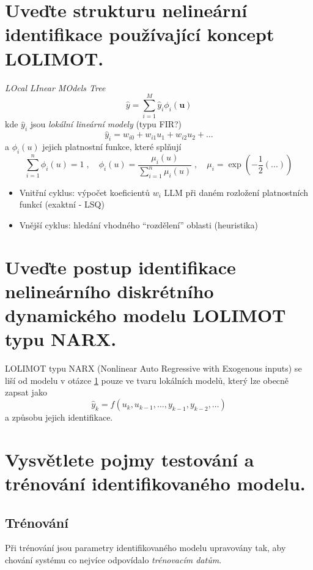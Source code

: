 \documentclass{article}
\begin{document}
	\section{Uveďte strukturu nelineární identifikace používající koncept LOLIMOT. } \label{lolimot}
	\emph{LOcal LInear MOdels Tree}
	\begin{equation}
		\hat{y} = \sum_{i=1}^M \hat{y}_i \phi_i(\bm{u})
	\end{equation}
	kde $\hat{y}_i$ jsou \emph{lokální lineární modely} (typu FIR?)
	\begin{equation}
		\hat{y}_i = w_{i0} + w_{i1} u_1 + w_{i2} u_2 + \dots
	\end{equation}
	a $\phi_i(u)$ jejich platnostní funkce, které splňují
	\begin{equation}
		\sum_{i=1}^n \phi_i(u) = 1
		\;,\quad 
		\phi_i(u) = \frac{\mu_i(u)}{\sum_{i=1}^n \mu_i(u)}
		\;,\quad 
		\mu_i = \exp(-\frac{1}{2}(...))
	\end{equation}

	\begin{itemize}
	\item Vnitřní cyklus: výpočet koeficientů $w_i$ LLM při daném rozložení platnostních funkcí (exaktní - LSQ)
	\item Vnější cyklus: hledání vhodného ``rozdělení'' oblasti (heuristika)
	\end{itemize}


	\section{Uveďte postup identifikace nelineárního diskrétního dynamického modelu LOLIMOT typu NARX. }

	LOLIMOT typu NARX (Nonlinear Auto Regressive with Exogenous inputs) se liší od modelu v otázce \ref{lolimot} pouze ve tvaru lokálních modelů, který lze obecně zapsat jako
	\begin{equation}
		\hat{y}_k = f(u_k,u_{k-1},\dots,y_{k-1},y_{k-2},\dots)
	\end{equation}
	a způsobu jejich identifikace.

	\section{Vysvětlete pojmy testování a trénování identifikovaného modelu.}

	\subsection*{Trénování}
	Při trénování jsou parametry identifikovaného modelu upravovány tak, aby chování systému co nejvíce odpovídalo \emph{trénovacím datům}.
\end{document}
